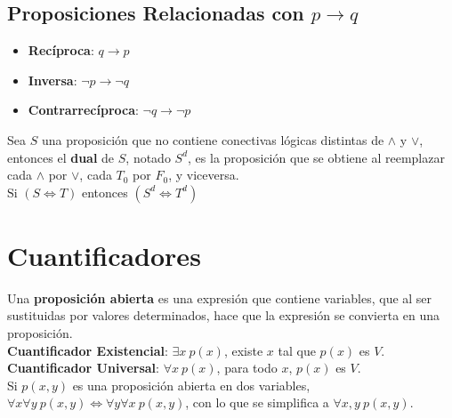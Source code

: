\documentclass[11pt,a4paper]{article}
\begin{document}
\subsection{Proposiciones Relacionadas con $p \rightarrow q$}
\begin{multicols}{3}
\begin{itemize}[leftmargin=*]
\item \textbf{Rec\'iproca}: $q \rightarrow p$
\item \textbf{Inversa}: $\lnot p \rightarrow \lnot q$
\item \textbf{Contrarrecíproca}: $\lnot q \rightarrow \lnot p$
\end{itemize}
\end{multicols}

\noindent Sea $S$ una proposici\'on que no contiene conectivas l\'ogicas distintas de $\land$ y $\lor$, entonces el \textbf{dual} de $S$, notado $S^d$, es la proposici\'on que se obtiene al reemplazar cada $\land$ por $\lor$, cada $T_0$ por $F_0$, y viceversa.\\
\indent \indent \indent \indent \indent \indent \indent \indent \indent \indent \indent $\text{Si } (S \Leftrightarrow T)$ entonces $(S^d \Leftrightarrow T^d)$

\section{Cuantificadores}
\noindent Una \textbf{proposición abierta} es una expresi\'on que contiene variables, que al ser sustituidas por valores determinados, hace que la expresión se convierta en una proposición.\\

\noindent \textbf{Cuantificador Existencial}: $\exists x\ p(x)$, existe $x$ tal que $p(x)$ es $V$.\\
\noindent \textbf{Cuantificador Universal}: $\forall x\ p(x)$, para todo $x$, $p(x)$ es $V$.\\

\noindent Si $p(x,y)$ es una proposici\'on abierta en dos variables, $\forall x \forall y\ p(x,y) \Leftrightarrow \forall y \forall x\ p(x,y)$, con lo que se simplifica a $\forall x, y\ p(x,y)$.
\end{document}
